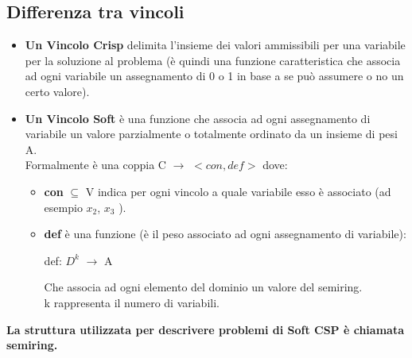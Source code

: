 \subsection{Differenza tra vincoli}
\begin{itemize}
    \item \textbf{Un Vincolo Crisp} delimita l'insieme dei valori ammissibili
          per una variabile per la soluzione al problema (è quindi una funzione
          caratteristica che associa ad ogni variabile un assegnamento di 0 o 1 in
          base a se può assumere o no un certo valore).
    \item \textbf{Un Vincolo Soft} è una funzione che associa ad ogni
          assegnamento di variabile un valore parzialmente o totalmente ordinato
          da un insieme di pesi A. \\Formalmente è una coppia C $\rightarrow$
          $<con, def>$ dove:

          \begin{itemize}
              \item \textbf{con} $\subseteq$ V indica per ogni vincolo a quale
                    variabile esso è associato (ad esempio $x_2 $, $x_3$ ).
              \item \textbf{def} è una funzione (è il peso associato ad ogni
                    assegnamento di variabile):
                    \begin{center}
                        def: $D^k$ $\rightarrow$ A

                        Che associa ad ogni elemento del dominio un valore del
                        semiring. \\k rappresenta il numero di variabili.
                    \end{center}
          \end{itemize}
\end{itemize}
\textbf{La struttura utilizzata per descrivere problemi di Soft CSP è chiamata semiring.}

